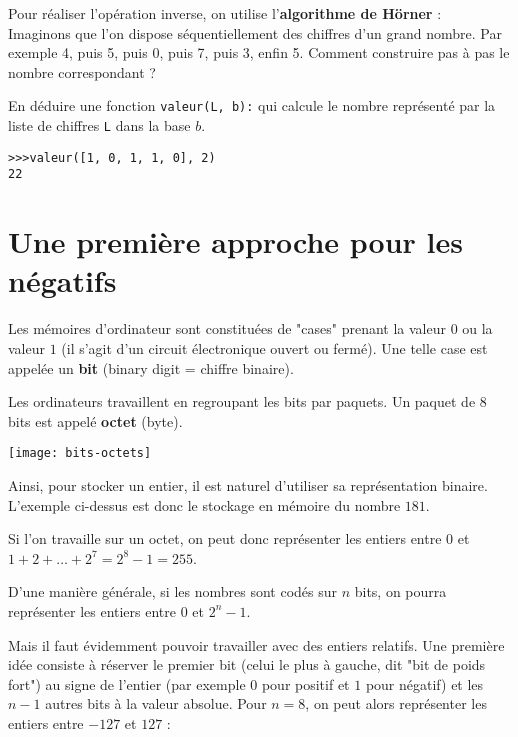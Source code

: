 Pour réaliser l'opération inverse, on utilise 
 l'\textbf{algorithme de Hörner} :\\

Imaginons que l'on dispose séquentiellement des chiffres d'un grand nombre. Par exemple 4, puis 5, puis 0, puis 7, puis 3, enfin 5. Comment construire pas à pas le nombre correspondant ?


\exercice

En déduire une fonction \verb!valeur(L, b):! qui calcule le nombre représenté par la liste de chiffres \verb!L! dans la base $b$.


\begin{lstlisting}
>>>valeur([1, 0, 1, 1, 0], 2)
22
\end{lstlisting}




\section{Une première approche pour les négatifs}

Les mémoires d'ordinateur sont constituées de "cases" prenant la valeur $0$ ou la valeur $1$ (il s'agit d'un circuit électronique ouvert ou fermé). Une telle case est appelée un \textbf{bit} (binary digit = chiffre binaire). 

\smallskip

Les ordinateurs travaillent en regroupant les bits par paquets. Un paquet de $8$ bits est appelé \textbf{octet} (byte).

\begin{center}
\texttt{[image: bits-octets]}
\end{center}

Ainsi, pour stocker un entier, il est naturel d'utiliser sa représentation binaire. L'exemple ci-dessus est donc le stockage en mémoire du nombre $181$.

\medskip

Si l'on travaille sur un octet, on peut donc représenter les entiers entre $0$ et $1+2+\dots+2^7=2^8-1=255$.

D'une manière générale, si les nombres sont codés sur $n$ bits, on pourra représenter les entiers entre $0$ et $2^n-1$.

\medskip
Mais il faut évidemment pouvoir travailler avec des entiers relatifs. Une première idée consiste à réserver le premier bit (celui le plus à gauche, dit "bit de poids fort") au signe de l'entier (par exemple $0$ pour positif et $1$ pour négatif) et les $n-1$ autres bits à la valeur absolue. Pour $n=8$, on peut alors représenter les entiers entre $-127$ et $127$ :


